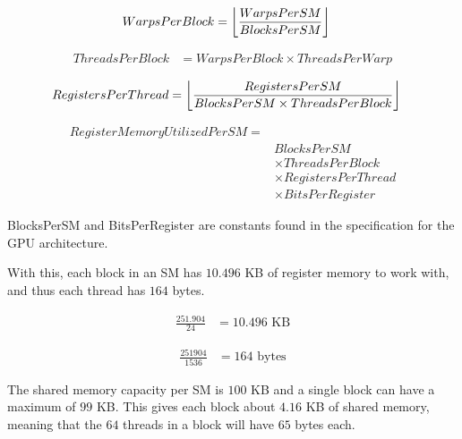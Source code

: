 \begin{equation}
\begin{split}
  WarpsPerBlock &= \floor*{\frac{WarpsPerSM}{BlocksPerSM}}
\end{split}
\end{equation}

\begin{equation}
\begin{split}
  ThreadsPerBlock &= WarpsPerBlock \times ThreadsPerWarp
\end{split}
\end{equation}

\begin{equation}
\begin{split}
  RegistersPerThread &= \floor*{\frac{RegistersPerSM}{BlocksPerSM \times ThreadsPerBlock}}
\end{split}
\end{equation}

\begin{equation} \label{eq:reg_mem_utilized_per_sm}
\begin{split}
  RegisterMemoryUtilizedPerSM =\\
  &BlocksPerSM\\
  &\times ThreadsPerBlock\\
  &\times RegistersPerThread\\
  &\times BitsPerRegister
\end{split}
\end{equation}

BlocksPerSM and BitsPerRegister are constants found in the specification for the GPU architecture.

With this, each block in an SM has $10.496$ KB of register memory to work with, and thus each thread has $164$ bytes.

\begin{equation}
\begin{split}
  \frac{251.904}{24} &= 10.496 \text{ KB}
\end{split}
\end{equation}

\begin{equation}
\begin{split}
  \frac{251904}{1536} &= 164 \text{ bytes}
\end{split}
\end{equation}

The shared memory capacity per SM is $100$ KB and a single block can have a maximum of $99$ KB. This gives each block about $4.16$ KB of shared memory, meaning that the $64$ threads in a block will have $65$ bytes each.

